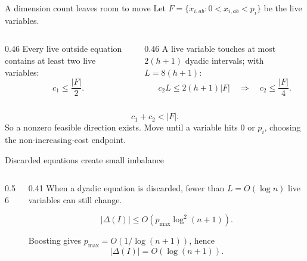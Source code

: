 \documentclass[aspectratio=169,12pt]{beamer}
\newcommand{\1}{\mathbf{1}}
\begin{document}
\begin{frame}{A dimension count leaves room to move}
  Let \(F=\{x_{i,ab}:0<x_{i,ab}<p_i\}\) be the live variables.

  \vspace{0.22cm}
  \begin{columns}[T,onlytextwidth]
    \begin{column}{0.46\textwidth}
      Every live outside equation contains at least two live variables:
      \[
        c_1\le\frac{|F|}{2}.
      \]
    \end{column}
    \begin{column}{0.46\textwidth}
      A live variable touches at most \(2(h+1)\) dyadic intervals; with
      \(L=8(h+1)\):
      \[
        c_2L\le2(h+1)|F|
        \quad\Rightarrow\quad
        c_2\le\frac{|F|}{4}.
      \]
    \end{column}
  \end{columns}

  \vspace{0.20cm}
  \[
    c_1+c_2<|F|.
  \]
  So a nonzero feasible direction exists. Move until a variable hits
  \(0\) or \(p_i\), choosing the non-increasing-cost endpoint.
\end{frame}

\begin{frame}{Discarded equations create small imbalance}
  \begin{columns}[T,onlytextwidth]
    \begin{column}{0.56\textwidth}
      \centering
      \resizebox{0.93\linewidth}{!}{\StRoundedChords}
    \end{column}
    \begin{column}{0.41\textwidth}
      When a dyadic equation is discarded, fewer than \(L=O(\log n)\) live
      variables can still change.

      \[
        |\Delta(I)|
        \le O\!\left(p_{\max}\log^2(n+1)\right).
      \]

      Boosting gives
      \(p_{\max}=O(1/\log(n+1))\), hence
      \[
        \boxed{|\Delta(I)|=O(\log(n+1)).}
      \]
    \end{column}
  \end{columns}
\end{frame}
\end{document}
